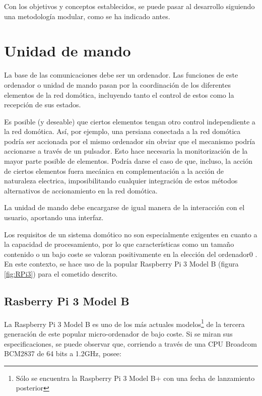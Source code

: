 Con los objetivos y conceptos establecidos, se puede pasar al desarrollo siguiendo una metodología modular, como se ha indicado antes.

\section{Unidad de mando}

La base de las comunicaciones debe ser un ordenador. Las funciones de este ordenador o unidad de mando pasan por la coordinación de los diferentes elementos de la red domótica, incluyendo tanto el control de estos como la recepción de sus estados.

Es posible (y deseable) que ciertos elementos tengan otro control independiente a la red domótica. Así, por ejemplo, una persiana conectada a la red domótica podría ser accionada por el mismo ordenador sin obviar que el mecanismo podría accionarse a través de un pulsador. Esto hace necesaria la monitorización de la mayor parte posible de elementos. Podría darse el caso de que, incluso, la acción de ciertos elementos fuera mecánica en complementación a la acción de naturaleza electrica, imposibilitando cualquier integración de estos métodos alternativos de accionamiento en la red domótica. 

La unidad de mando debe encargarse de igual manera de la interacción con el usuario, aportando una interfaz.

Los requisitos de un sistema domótico no son especialmente exigentes en cuanto a la capacidad de procesamiento, por lo que características como un tamaño contenido o un bajo coste se valoran positivamente en la elección del ordenador0
.
En este contexto, se hace uso de la popular Raspberry Pi 3 Model B (figura \ref{fig:RPi3}) para el cometido descrito.

\subsection{Rasberry Pi 3 Model B}

La Raspberry Pi 3 Model B es uno de los más actuales modelos\footnote{Sólo se encuentra la Raspberry Pi 3 Model B+ con una fecha de lanzamiento posterior} de la tercera generación de este popular micro-ordenador de bajo coste. Si se miran sus especificaciones, se puede observar que, corriendo a través de una CPU Broadcom BCM2837 de 64 bits a 1.2GHz, posee:

